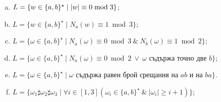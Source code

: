 \begin{problem}
\begin{enumerate}[a)]
  \item
    $L = \{w \in \{a,b\}^\star \mid \lvert{w}\rvert \equiv 0 \bmod 3\}$;
  \item
    $L = \{w \in \{a,b\}^\star \mid N_a(w) \equiv 1 \bmod 3\}$;
  \item
    $L = \{\omega \in \{a,b\}^\star \mid N_a(\omega) \equiv 0 \bmod 3\ \&\ N_b(\omega) \equiv 1 \bmod 2\}$;
  \item
    $L = \{\omega \in \{a,b\}^\star \mid N_a(\omega) \equiv 0 \bmod 2\ \vee\ \omega\mbox{ съдържа точно две }b\}$;
  \item
    $L = \{\omega \in \{a,b\}^\star \mid \omega \text{ съдържа равен брой срещания на }ab\text{ и на }ba\}$.
  \item
    $L = \{\omega_1 \sharp \omega_2 \sharp \omega_3 \mid \forall i \in [1,3](\omega_i \in \{a,b\}^\star\ \&\ |\omega_i| \geq i+1)\}$;
  \end{enumerate}
\end{problem}
  
